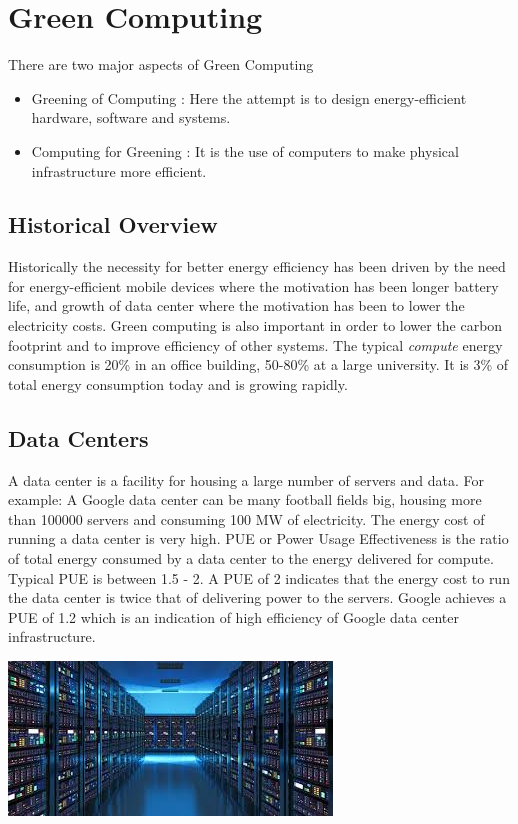 \documentclass[twoside]{article}
\begin{document}
\section{Green Computing}
There are two major aspects of Green Computing
\begin{itemize}
    \item Greening of Computing : Here the attempt is to design energy-efficient hardware, software and systems.
    \item Computing for Greening : It is the use of computers to make physical infrastructure more efficient.
\end{itemize}

\subsection{Historical Overview}
Historically the necessity for better energy efficiency has been driven by the need for energy-efficient mobile devices where the motivation has been longer battery life, and growth of data center where the motivation has been to lower the electricity costs. 
Green computing is also important in order to lower the carbon footprint and to improve efficiency of other systems.
The typical \textit{compute} energy consumption is 20\% in an office building, 50-80\% at a large university. It is 3\% of total energy consumption today and is growing rapidly.

\subsection{Data Centers}
A data center is a facility for housing a large number of servers and data. For example: A Google data center can be many football fields big, housing more than 100000 servers and consuming 100 MW of electricity.
The energy cost of running a data center is very high. PUE or Power Usage Effectiveness is the ratio of total energy consumed by a data center to the energy delivered for compute. Typical PUE is between 1.5 - 2. A PUE of 2 indicates that the energy cost to run the data center is twice that of delivering power to the servers. Google achieves a PUE of 1.2 which is an indication of high efficiency of Google data center infrastructure. \\
\begin{center}
    \includegraphics[scale=0.5]{data_center.jpeg}    
\end{center}
\end{document}
